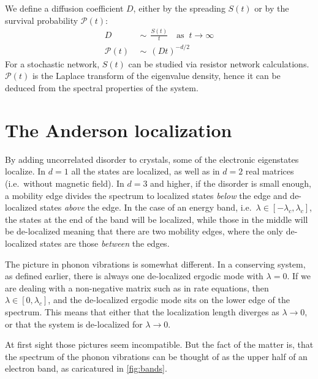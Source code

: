 We define a diffusion coefficient $D$, either by the spreading $S(t)$
or by the survival probability $\mathcal{P}(t)$:
%
\begin{align}
D\ \ &\sim\ \ \frac{S(t)}{t}  \quad \textrm{as }\ t\rightarrow\infty \\
\mathcal{P}(t)\ \ &\sim\ \ (Dt)^{-d/2}
\end{align}
%
For a stochastic network, $S(t)$ can be studied via resistor network 
calculations. $\mathcal{P}(t)$ is the Laplace transform of the 
eigenvalue density, hence it can be deduced from the spectral properties of the 
system. 
%


\section{The Anderson localization}\label{sec:anderson}

By adding uncorrelated disorder to crystals, some of the electronic eigenstates 
localize. In  $d=1$ all the states are localized, as well as in $d=2$ real matrices 
(i.e.\ without magnetic field). In $d=3$ and higher, if the disorder
is small enough, a mobility edge divides the spectrum to localized states \emph{below} the edge and 
de-localized states \emph{above} the edge. In the case of an energy band, i.e.\ $\lambda\in [-\lambda_c,\lambda_c]$,
the states at the end of the band will be localized, while those in the middle
will be de-localized meaning that there are two mobility edges,
where the only de-localized states are those \emph{between} the edges.


The picture in phonon vibrations is somewhat different. In a conserving
system, as defined earlier, there is always one de-localized ergodic mode with $\lambda=0$.
If we are dealing with a non-negative matrix such as in rate equations, 
then $\lambda \in [0,\lambda_c]$, and the de-localized ergodic mode
sits on the lower edge of the spectrum. This means that either that the localization 
length diverges as $\lambda\rightarrow 0$, or that the system is de-localized for
$\lambda\rightarrow 0$.


At first sight those pictures seem incompatible. But the fact 
of the matter is, that the spectrum of the phonon vibrations
can be thought of as the upper half of an electron band, as caricatured in \autoref{fig:bands}.



